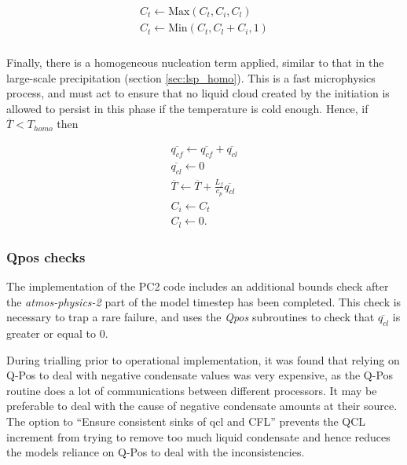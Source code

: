 \documentclass{UMDP_article}
\begin{document}
\begin{eqnarray}
C_t \leftarrow \text{Max}( C_t, C_i, C_l ) \nonumber \\
C_t \leftarrow \text{Min}( C_t , C_l + C_i, 1)
\label{eq:ctchecks}
\end{eqnarray}

\subsubsection{} 
Finally, there is a homogeneous nucleation term applied, similar 
to that in the large-scale precipitation (section \ref{sec:lsp_homo}). This is
a fast microphysics process, and must act to ensure that no liquid cloud
created by the initiation is allowed to persist in this phase if the
temperature is cold enough. Hence, if $\overline{T} < T_{homo}$ then

\begin{eqnarray}
\overline{q_{cf}} \leftarrow \overline{q_{cf}} + \overline{q_{cl}} \nonumber \\
\overline{q_{cl}} \leftarrow 0 \nonumber \\
\overline{T} \leftarrow \overline{T} + \frac{L_f}{c_p} \overline{q_{cl}} \nonumber \\
C_i \leftarrow C_t \nonumber \\
C_l \leftarrow 0.
\label{eq:homochecks}
\end{eqnarray}

\subsubsection{Qpos checks}
\label{sec:qpos}

The implementation of the PC2 code includes an additional bounds check after
the \textit{atmos-physics-2} part of the model timestep has been completed. This
check is necessary to trap a rare failure, and uses the \textit{Qpos} subroutines
to check that $\overline{q_{cl}}$ is greater or equal to 0.

During trialling prior to operational implementation, it was found that relying on Q-Pos  
to deal with negative condensate values was very expensive, as the Q-Pos routine does a lot of communications between  
different processors. It may be preferable to deal with the cause of negative condensate amounts at their source.  
The option to ``Ensure consistent sinks of qcl and CFL'' 
prevents the QCL increment from 
trying to remove too much liquid condensate and hence reduces the models reliance on Q-Pos to 
deal with the inconsistencies.
\end{document}
